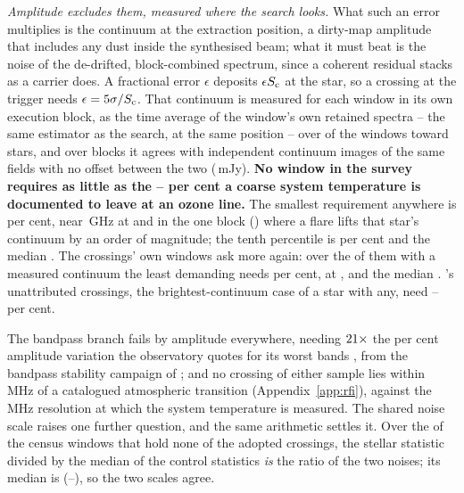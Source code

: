 \emph{Amplitude excludes them, measured where the search looks.} What such
an error multiplies is the continuum at the extraction position, a dirty-map
amplitude that includes any dust inside the synthesised beam; what it must
beat is the noise of the de-drifted, block-combined spectrum, since a
coherent residual stacks as a carrier does. A fractional error $\epsilon$
deposits $\epsilon S_{\rm c}$ at the star, so a crossing at the trigger needs
$\epsilon=5\sigma/S_{\rm c}$. That continuum is measured for each window in
its own execution block, as the time average of the window's own retained
spectra -- the same estimator as the search, at the same position -- over
\CyNWinMeas{} of the \CyNWinTot{} windows toward \CyNStarMeas{} stars, and
over \CyNRouteBlock{} blocks it agrees with independent continuum images of
the same fields with no offset between the two (\CyRouteBiasMJy\,mJy).
\textbf{No window in the survey requires as little as the
\CySpecTsysLo--\CySpecTsysHi{} per cent a coarse system temperature is
documented to leave at an ozone line.} The smallest requirement anywhere is
\CyEpsMinPct{} per cent, near \CyEpsMinGHz\,GHz at \CyEpsMinStar{} and in the
one block (\texttt{\CyEpsMinBlock}) where a flare lifts that star's continuum
by an order of magnitude; the tenth percentile is \CyEpsTenthPct{} per cent
and the median \CyEpsMedPct. The crossings' own windows ask more again: over
the \CyNCrossMeas{} of them with a measured continuum the least demanding
needs \CyCrossEpsLoPct{} per cent, at \CyCrossEpsLoStar, and the median
\CyCrossEpsMedPct. \CxAuStar's \CyAuNCross{} unattributed crossings, the
brightest-continuum case of a star with any, need
\CyAuCrossEpsLoPct--\CyAuCrossEpsHiPct{} per cent.

The bandpass branch fails by amplitude everywhere, needing
$21\times$ the \CdSpecBpWorst{} per cent amplitude variation the
observatory quotes for its worst bands \citep{ALMAKBBandpass}, from the
bandpass stability campaign of \citet{ALMATechNote15}; and no crossing of either sample
lies within
\TlOffMin\,MHz of a catalogued atmospheric transition
(Appendix~\ref{app:rfi}), against the \CdSpecTsysRes\,MHz resolution at which
the system temperature is measured. The shared noise scale raises one
further question, and the same arithmetic settles it. Over the \NsrNWin{} of
the \NWindows{} census windows that hold none of the adopted crossings, the
stellar statistic divided by the median of the \NCtrl{} control statistics
\emph{is} the ratio of the two noises; its median is \NsrMed{}
(\NsrLo--\NsrHi), so the two scales agree.

